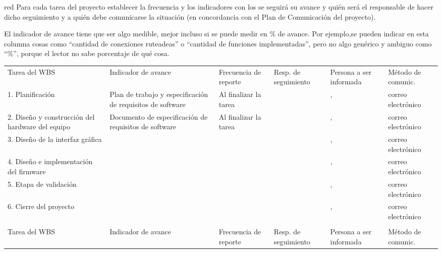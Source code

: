 \documentclass[11pt]{charter}
\begin{document}
\begin{consigna}{red}
Para cada tarea del proyecto establecer la frecuencia y los indicadores con los se seguirá su avance y quién será el responsable de hacer dicho seguimiento y a quién debe comunicarse la situación (en concordancia con el Plan de Comunicación del proyecto).

El indicador de avance tiene que ser algo medible, mejor incluso si se puede medir en \% de avance. Por ejemplo,se pueden indicar en esta columna cosas como ``cantidad de conexiones ruteadeas'' o ``cantidad de funciones implementadas'', pero no algo genérico y ambiguo como ``\%'', porque el lector no sabe porcentaje de qué cosa.

\end{consigna}

\begin{longtable}{|m{1cm}|m{3.5cm}|m{2.2cm}|m{2cm}|m{3cm}|m{1.5cm}|}
\hline
\rowcolor[HTML]{C0C0C0} 
\multicolumn{6}{|c|}{\cellcolor[HTML]{C0C0C0}SEGUIMIENTO DE AVANCE}                                                                       \\ \hline
\rowcolor[HTML]{C0C0C0} 
Tarea del WBS 			& Indicador de avance & Frecuencia de reporte & Resp. de seguimiento & Persona a ser informada & Método de comunic. \\ \hline
\endfirsthead

1. Planificación									& Plan de trabajo y especificación de requisitos de software & Al finalizar la tarea & \authorname & \clientename, \supname & correo electrónico \\ \hline
2. Diseño y construcción del hardware del equipo	& Documento de especificación de requisitos de software  & Al finalizar la tarea & \authorname & \clientename, \supname & correo electrónico \\ \hline
3. Diseño de la interfaz gráfica					&  &  & \authorname & \clientename, \supname & correo electrónico \\ \hline
4. Diseño e implementación del firmware			&  &  & \authorname & \clientename, \supname & correo electrónico \\ \hline
5. Etapa de validación							&  &  & \authorname & \clientename, \supname & correo electrónico \\ \hline
6. Cierre del proyecto							&  &  & \authorname & \clientename, \supname & correo electrónico \\ \hline

\hline
\rowcolor[HTML]{C0C0C0} 
\multicolumn{6}{c}{\cellcolor[HTML]{C0C0C0}SEGUIMIENTO DE AVANCE}                                                                       \\ \hline
\rowcolor[HTML]{C0C0C0} 
Tarea del WBS 			& Indicador de avance & Frecuencia de reporte & Resp. de seguimiento & Persona a ser informada & Método de comunic. \\ \hline
\endhead


\end{longtable}
\end{document}
